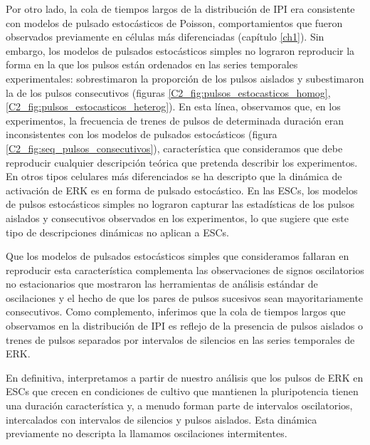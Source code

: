 \documentclass[./main.tex]{subfiles}
\begin{document}
Por otro lado, la cola de tiempos largos de la distribución de IPI era consistente con modelos de pulsado estocásticos de Poisson, comportamientos que fueron observados previamente en células más diferenciadas (capítulo \ref{ch1}). Sin embargo, los modelos de pulsados estocásticos simples no lograron reproducir la forma en la que los pulsos están ordenados en las series temporales experimentales: sobrestimaron la proporción de los pulsos aislados y subestimaron la de los pulsos consecutivos (figuras \ref{C2_fig:pulsos_estocasticos_homog}, \ref{C2_fig:pulsos_estocasticos_heterog}). En esta línea, observamos que, en los experimentos, la frecuencia de trenes de pulsos de determinada duración eran inconsistentes con los modelos de pulsados estocásticos (figura \ref{C2_fig:seq_pulsos_consecutivos}), característica que consideramos que debe reproducir cualquier descripción teórica que pretenda describir los experimentos.
En otros tipos celulares más diferenciados se ha descripto que la dinámica de activación de ERK es en forma de pulsado estocástico. En las ESCs, los modelos de pulsos estocásticos simples no lograron capturar las estadísticas de los pulsos aislados y consecutivos observados en los experimentos, lo que sugiere que este tipo de descripciones dinámicas no aplican a ESCs. 


Que los modelos de pulsados estocásticos simples que consideramos fallaran en reproducir esta característica complementa las observaciones de signos oscilatorios no estacionarios que mostraron las herramientas de análisis estándar de oscilaciones y el hecho de que los pares de pulsos sucesivos sean mayoritariamente consecutivos. Como complemento, inferimos que la cola de tiempos largos que observamos en la distribución de IPI es reflejo de la presencia de pulsos aislados o trenes de pulsos separados por intervalos de silencios en las series temporales de ERK. 


En definitiva, interpretamos a partir de nuestro análisis que los pulsos de ERK en ESCs que crecen en condiciones de cultivo que mantienen la pluripotencia tienen una duración característica y, a menudo forman parte de intervalos oscilatorios, intercalados con intervalos de silencios y pulsos aislados. Esta dinámica previamente no descripta la llamamos oscilaciones intermitentes. 
\end{document}
